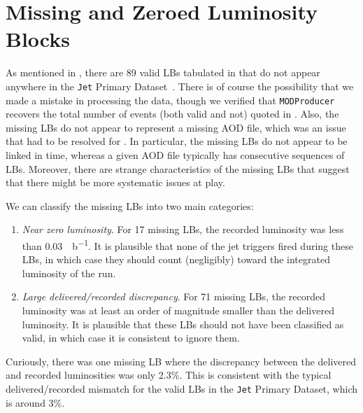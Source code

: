 \documentclass[aps,prd,twocolumn,preprintnumbers,nofootinbib,longbibliography,floatfix,superscriptaddress]{revtex4-1}
\begin{document}
\appendix


\section{Missing and Zeroed Luminosity Blocks}
\label{app:missinglumi}

As mentioned in , there are 89 valid LBs tabulated in  that do not appear anywhere in the \texttt{Jet} Primary Dataset~\cite{CMS:JetPrimary2011A}.
%
There is of course the possibility that we made a mistake in processing the data, though we verified that \texttt{MODProducer} recovers the total number of events (both valid and not) quoted in .
%
Also, the missing LBs do not appear to represent a missing AOD file, which was an issue that had to be resolved for .
%
In particular, the missing LBs do not appear to be linked in time, whereas a given AOD file typically has consecutive sequences of LBs.
%
Moreover, there are strange characteristics of the missing LBs that suggest that there might be more systematic issues at play.


We can classify the missing LBs into two main categories:
%
\begin{enumerate}
%
\item \textit{Near zero luminosity}.  For 17 missing LBs, the recorded luminosity was less than \SI{0.03}{\mu b^{-1}}. It is plausible that none of the jet triggers fired during these LBs, in which case they should count (negligibly) toward the integrated luminosity of the run.
%
\item \textit{Large delivered/recorded discrepancy}.  For 71 missing LBs, the recorded luminosity was at least an order of magnitude smaller than the delivered luminosity.  It is plausible that these LBs should not have been classified as  valid, in which case it is consistent to ignore them.
%
\end{enumerate}
%
Curiously, there was one missing LB where the discrepancy between the delivered and recorded luminosities was only 2.3\%.
%
This is consistent with the typical delivered/recorded mismatch for the valid LBs in the \texttt{Jet} Primary Dataset, which is around 3\%.
\end{document}
